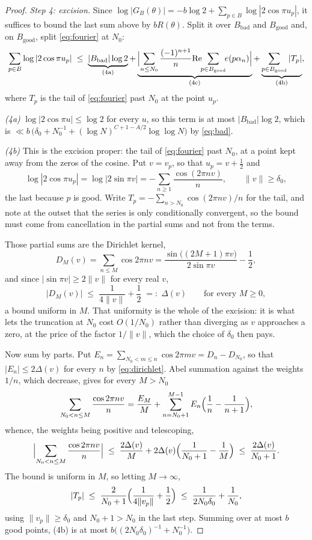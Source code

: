 \documentclass[11pt,a4paper]{article}
\theoremstyle{plain}
\theoremstyle{definition}
\theoremstyle{remark}
\begin{document}
\begin{proof}
\emph{Step 4: excision.} Since
$\log|G_B(\theta)|=-b\log2+\sum_{p\in B}\log|2\cos\pi u_p|$, it suffices to bound
the last sum above by $bR(\theta)$. Split it over $B_{\mathrm{bad}}$ and
$B_{\mathrm{good}}$ and, on $B_{\mathrm{good}}$, split \eqref{eq:fourier} at
$N_0$:
\[
  \sum_{p\in B}\log|2\cos\pi u_p|
  \;\le\;\underbrace{|B_{\mathrm{bad}}|\log2}_{\text{(4a)}}
   +\underbrace{\Bigl|\sum_{n\le N_0}\frac{(-1)^{n+1}}{n}
       \mathrm{Re}\!\!\sum_{p\in B_{\mathrm{good}}}\!\!e(p\alpha_n)\Bigr|}_{\text{(4c)}}
   +\underbrace{\sum_{p\in B_{\mathrm{good}}}|T_p|}_{\text{(4b)}} ,
\]
where $T_p$ is the tail of \eqref{eq:fourier} past $N_0$ at the point $u_p$.

\emph{(4a)} $\log|2\cos\pi u|\le\log2$ for every $u$, so this term is at most
$|B_{\mathrm{bad}}|\log2$, which is $\ll b\,\bigl(\delta_0+N_0^{-1}
+(\log N)^{C+1-A/2}\log\log N\bigr)$ by \eqref{eq:bad}.

\emph{(4b)} This is the excision proper: the tail of \eqref{eq:fourier} past
$N_0$, at a point kept away from the zeros of the cosine. Put $v=v_p$, so that
$u_p=v+\tfrac12$ and
\[
  \log|2\cos\pi u_p|=\log|2\sin\pi v|=-\sum_{n\ge1}\frac{\cos(2\pi nv)}{n},
  \qquad \|v\|\ge\delta_0 ,
\]
the last because $p$ is good. Write $T_p=-\sum_{n>N_0}\cos(2\pi nv)/n$ for the
tail, and note at the outset that the series is only conditionally convergent,
so the bound must come from cancellation in the partial sums and not from the
terms.

Those partial sums are the Dirichlet kernel,
\[
  D_M(v)=\sum_{n\le M}\cos2\pi nv=\frac{\sin\bigl((2M+1)\pi v\bigr)}{2\sin\pi v}-\frac12 ,
\]
and since $|\sin\pi v|\ge2\|v\|$ for every real $v$,
\begin{equation}\label{eq:dirichlet}
  |D_M(v)|\;\le\;\frac{1}{4\|v\|}+\frac12\;=:\;\Delta(v)
  \qquad\text{for every }M\ge0 ,
\end{equation}
a bound uniform in $M$. That uniformity is the whole of the excision: it is what
lets the truncation at $N_0$ cost $O(1/N_0)$ rather than diverging as $v$
approaches a zero, at the price of the factor $1/\|v\|$, which the choice of
$\delta_0$ then pays.

Now sum by parts. Put $E_n=\sum_{N_0<m\le n}\cos2\pi mv=D_n-D_{N_0}$, so that
$|E_n|\le2\Delta(v)$ for every $n$ by \eqref{eq:dirichlet}. Abel summation
against the weights $1/n$, which decrease, gives for every $M>N_0$
\[
  \sum_{N_0<n\le M}\frac{\cos 2\pi nv}{n}
  =\frac{E_M}{M}+\sum_{n=N_0+1}^{M-1}E_n\Bigl(\frac1n-\frac1{n+1}\Bigr),
\]
whence, the weights being positive and telescoping,
\[
  \Bigl|\sum_{N_0<n\le M}\frac{\cos 2\pi nv}{n}\Bigr|
  \;\le\;\frac{2\Delta(v)}{M}
   +2\Delta(v)\Bigl(\frac1{N_0+1}-\frac1M\Bigr)
  \;\le\;\frac{2\Delta(v)}{N_0+1}.
\]
The bound is uniform in $M$, so letting $M\to\infty$,
\begin{equation}\label{eq:tailbound}
  |T_p|\;\le\;\frac{2}{N_0+1}\Bigl(\frac1{4\|v_p\|}+\frac12\Bigr)
  \;\le\;\frac{1}{2N_0\delta_0}+\frac1{N_0},
\end{equation}
using $\|v_p\|\ge\delta_0$ and $N_0+1>N_0$ in the last step. Summing over at
most $b$ good points, (4b) is at most
$b\bigl((2N_0\delta_0)^{-1}+N_0^{-1}\bigr)$.


\end{proof}
\end{document}

